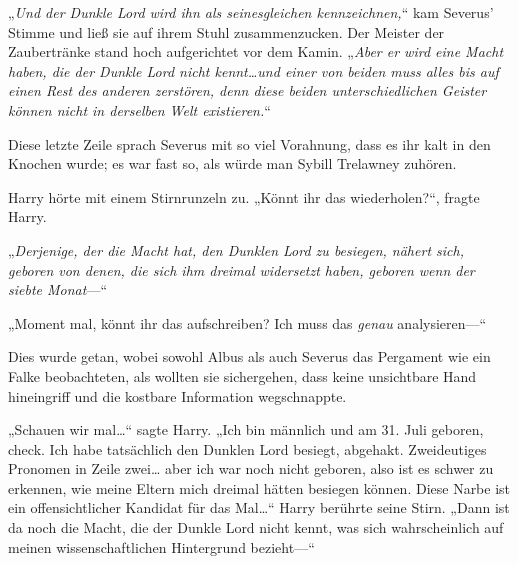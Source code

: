 „\emph{Und der Dunkle Lord wird ihn als seinesgleichen kennzeichnen,}“ kam Severus' Stimme und ließ sie auf ihrem Stuhl zusammenzucken. Der Meister der Zaubertränke stand hoch aufgerichtet vor dem Kamin. „\emph{Aber er wird eine Macht haben, die der Dunkle Lord nicht kennt…und einer von beiden muss alles bis auf einen Rest des anderen zerstören, denn diese beiden unterschiedlichen Geister können nicht in derselben Welt existieren.}“

Diese letzte Zeile sprach Severus mit so viel Vorahnung, dass es ihr kalt in den Knochen wurde; es war fast so, als würde man Sybill Trelawney zuhören.

Harry hörte mit einem Stirnrunzeln zu. „Könnt ihr das wiederholen?“, fragte Harry.

„\emph{Derjenige, der die Macht hat, den Dunklen Lord zu besiegen, nähert sich, geboren von denen, die sich ihm dreimal widersetzt haben, geboren wenn der siebte Monat}—“

„Moment mal, könnt ihr das aufschreiben? Ich muss das \emph{genau} analysieren—“

Dies wurde getan, wobei sowohl Albus als auch Severus das Pergament wie ein Falke beobachteten, als wollten sie sichergehen, dass keine unsichtbare Hand hineingriff und die kostbare Information wegschnappte.

„Schauen wir mal…“ sagte Harry. „Ich bin männlich und am 31. Juli geboren, check. Ich habe tatsächlich den Dunklen Lord besiegt, abgehakt. Zweideutiges Pronomen in Zeile zwei… aber ich war noch nicht geboren, also ist es schwer zu erkennen, wie meine Eltern mich dreimal hätten besiegen können. Diese Narbe ist ein offensichtlicher Kandidat für das Mal…“ Harry berührte seine Stirn. „Dann ist da noch die Macht, die der Dunkle Lord nicht kennt, was sich wahrscheinlich auf meinen wissenschaftlichen Hintergrund bezieht—“

